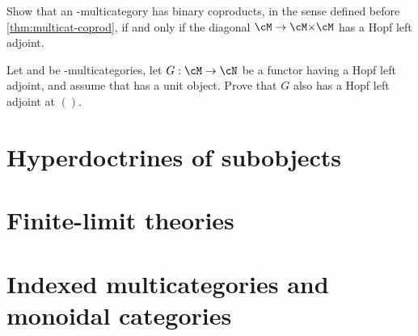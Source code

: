 \begin{ex}\label{ex:multicat-coprod-ladj}
  Show that an \fS-multicategory \cM has binary coproducts, in the sense defined before \cref{thm:multicat-coprod}, if and only if the diagonal $\cM\to \cM\times \cM$ has a Hopf left adjoint.
\end{ex}

\begin{ex}\label{ex:hopf-ladj-at-one}
  Let \cM and \cN be \fS-multicategories, let $G:\cM\to\cN$ be a functor having a Hopf left adjoint, and assume that \cN has a unit object.
  Prove that $G$ also has a Hopf left adjoint at $()$.
\end{ex}


\section{Hyperdoctrines of subobjects}
\label{sec:subobjects}




\section{Finite-limit theories}
\label{sec:lex-theories}


\section{Indexed multicategories and monoidal categories}
\label{sec:indexed-moncat}

